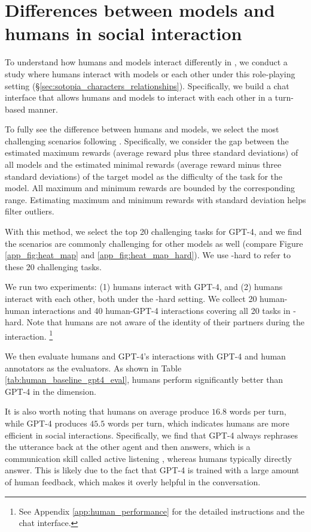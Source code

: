 \section{Differences between models and humans in social interaction}
\label{sec:human_performance}

To understand how humans and models interact differently in \sotopia, 
we conduct a study where humans interact with models or each other under this role-playing setting (\S\ref{sec:sotopia_characters_relationships}). 
Specifically, we build a chat interface that allows humans and models to interact with each other in a turn-based manner.

To fully see the difference between humans and models, we select the most challenging scenarios following \citet{dennis2020emergent, swayamdipta-etal-2020-dataset}. 
Specifically, we consider the gap between the estimated maximum rewards (average reward plus three standard deviations) of all models and the estimated minimal rewards (average reward minus three standard deviations) of the target model as the difficulty of the task for the model. 
All maximum and minimum rewards are bounded by the corresponding range.
Estimating maximum and minimum rewards with standard deviation helps filter outliers.

With this method, we select the top 20 challenging tasks for GPT-4, and we find the scenarios are commonly challenging for other models as well (compare Figure \ref{app_fig:heat_map} and \ref{app_fig:heat_map_hard}).
We use \sotopia-hard to refer to these 20 challenging tasks.


We run two experiments: (1) humans interact with GPT-4, and (2) humans interact with each other, both under the \sotopia -hard setting. 
We collect 20 human-human interactions and 40 human-GPT-4 interactions covering all 20 tasks in \sotopia -hard.
Note that humans are not aware of the identity of their partners during the interaction.%
\footnote{See Appendix \ref{app:human_performance} for the detailed instructions and the chat interface.}


We then evaluate humans and GPT-4's interactions with GPT-4 and human annotators as the evaluators.
As shown in Table \ref{tab:human_baseline_gpt4_eval}, humans perform significantly better than GPT-4 in the \goalcompletion dimension.

It is also worth noting that humans on average produce $16.8$ words per turn, while GPT-4 produces $45.5$ words per turn, which indicates humans are more efficient in social interactions.
Specifically, we find that GPT-4 always rephrases the utterance back at the other agent and then answers, which is a communication skill called active listening \citep{weger2014relative}, whereas humans typically directly answer.
This is likely due to the fact that GPT-4 is trained with a large amount of human feedback, which makes it overly helpful in the conversation.

